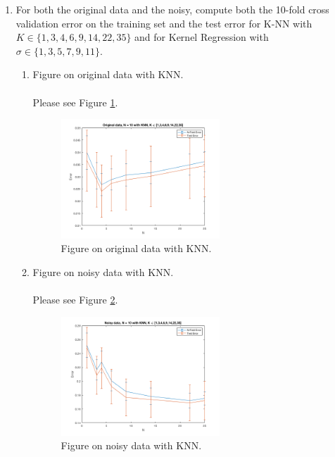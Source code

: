 \documentclass[english]{article}
\begin{document}
\begin{enumerate}[label=(\roman*)]
    \item For both the original data and the noisy, compute both the 10-fold cross validation error on the training set and the test error for K-NN with $K \in \{1,3,4,6,9,14,22,35\}$ and for Kernel Regression with $\sigma \in \{1,3,5,7,9,11\}$.
    \begin{enumerate}
      \item Figure on original data with KNN.\\ \\
        Please see Figure \ref{fig:221}. \\
        \begin{figure}[H]
          \centering
          \includegraphics[width=0.6\textwidth]{221.png}
          \caption{Figure on original data with KNN.}
          \label{fig:221}
        \end{figure}
        \item Figure on noisy data with KNN.\\ \\
        Please see Figure \ref{fig:222}. \\
        \begin{figure}[H]
          \centering
          \includegraphics[width=0.6\textwidth]{222.png}
          \caption{Figure on noisy data with KNN.}
          \label{fig:222}
        \end{figure}

\end{enumerate}
\end{enumerate}
\end{document}
